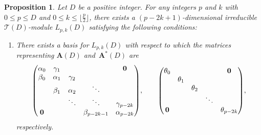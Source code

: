 \documentclass[10pt,a4paper]{amsart}
\def\A{\mathbf A}
\def\T{\mathcal T}
\numberwithin{equation}{section}
\newtheorem{Proposition}[Theorem]{Proposition}
 { \theoremstyle{definition}
\newtheorem{Definition}[Theorem]{Definition}
\newtheorem{Note}[Theorem]{Note}
\newtheorem{Example}[Theorem]{Example}
\newtheorem{Remark}[Theorem]{Remark} }
\begin{document}
\begin{Proposition}\label{prop:Kpk}
Let $D$ be a positive integer.
For any integers $p$ and $k$ with $0\leq p\leq D$ and $0\leq k\leq \big\lfloor \frac{p}{2}\big\rfloor$, there exists a $(p-2k+1)$-dimensional irreducible $\T(D)$-module $L_{p,k}(D)$ satisfying the following conditions:
\begin{enumerate}\itemsep=0pt
\item[$(i)$] There exists a basis for $L_{p,k}(D)$ with respect to which the matrices representing $\A(D)$ and~$\A^*(D)$ are
\begin{gather*}
\begin{pmatrix}
\alpha_0 &\gamma_1 & & &{\bf 0}
\\
\beta_0 &\alpha_1 &\gamma_2
\\
&\beta_1 &\alpha_2 &\ddots
 \\
& &\ddots &\ddots &\gamma_{p-2k}
 \\
{\bf 0} & & &\beta_{p-2k-1} &\alpha_{p-2k}
\end{pmatrix}\!,
\qquad
\begin{pmatrix}
\theta_0 & & & &{\bf 0}
\\
 &\theta_1
\\
 & &\theta_2
 \\
 & & &\ddots
 \\
{\bf 0} & & & &\theta_{p-2k}
\end{pmatrix}\!,
\end{gather*}
respectively.


\end{enumerate}
\end{Proposition}
\end{document}
